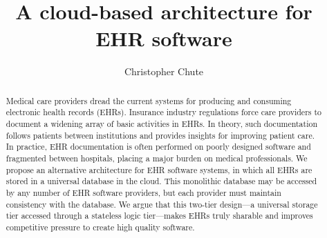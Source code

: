 \documentclass[sigconf]{acmart} %
\begin{document}
\title{A cloud-based architecture for EHR software}

\author{Christopher Chute}

\renewcommand{\shortauthors}{C. Chute}

\renewcommand\footnotetextcopyrightpermission[1]{}
\pagestyle{plain} 

\begin{abstract}
Medical care providers dread the current systems for producing and consuming electronic health records (EHRs). Insurance industry regulations force care providers to document a widening array of basic activities in EHRs. In theory, such documentation follows patients between institutions and provides insights for improving patient care. In practice, EHR documentation is often performed on poorly designed software and fragmented between hospitals, placing a major burden on medical professionals. We propose an alternative architecture for EHR software systems, in which all EHRs are stored in a universal database in the cloud. This monolithic database may be accessed by any number of EHR software providers, but each provider must maintain consistency with the database. We argue that this two-tier design---a universal storage tier accessed through a stateless logic tier---makes EHRs truly sharable and improves competitive pressure to create high quality software.
\end{abstract}

\maketitle





\end{document}
